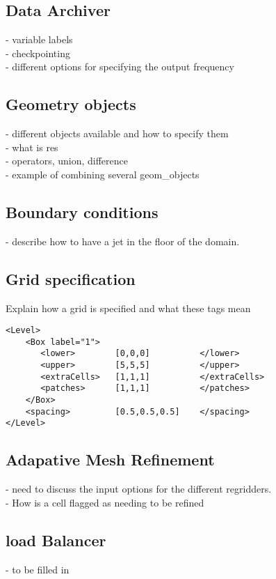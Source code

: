 \subsection{Data Archiver} \label{Sec:DataArchiver}
- variable labels\\
- checkpointing \\
- different options for specifying the output frequency\\
%
\subsection{Geometry objects} \label{Sec:GeometryObjects}
- different objects available and how to specify them\\
- what is res \\
- operators, union, difference\\
- example of combining several geom\_objects\\

\subsection{Boundary conditions}
- describe how to have a jet in the floor of the domain.
%
\subsection{Grid specification} \label{Sec:Grid}
Explain how a grid is specified and what these tags mean

\begin{Verbatim}[fontsize=\footnotesize]
<Level>
    <Box label="1">
       <lower>        [0,0,0]          </lower>
       <upper>        [5,5,5]          </upper>
       <extraCells>   [1,1,1]          </extraCells>
       <patches>      [1,1,1]          </patches>
    </Box>
    <spacing>         [0.5,0.5,0.5]    </spacing>
</Level>
 \end{Verbatim}
%
\subsection{Adapative Mesh Refinement}
- need to discuss the input options for the different regridders.\\
- How is a cell flagged as needing to be refined
%
\subsection{load Balancer}
- to be filled in

